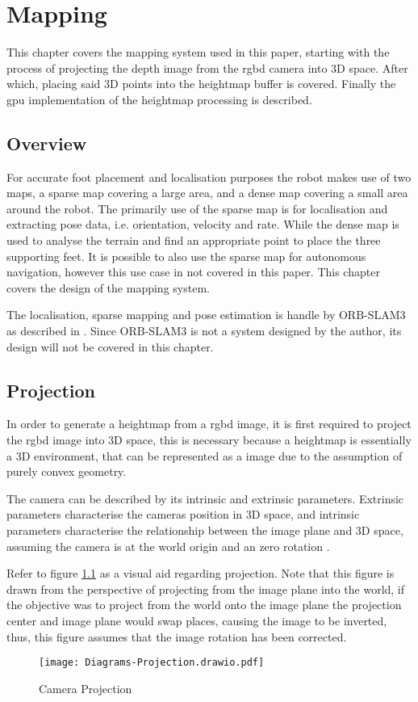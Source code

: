 \chapter{Mapping} \label{chap:mapping}
    This chapter covers the mapping system used in this paper, starting with the process of projecting the depth image from the \ac{rgbd} camera into 3D space.
    After which, placing said 3D points into the heightmap buffer is covered. Finally the \ac{gpu} implementation of the heightmap processing is described.
    \section{Overview}
        For accurate foot placement and localisation purposes the robot makes use of two maps, a sparse map covering a large area, and a dense map covering a small
        area around the robot. The primarily use of the sparse map is for localisation and extracting pose data, i.e. orientation, velocity and rate. While the dense
        map is used to analyse the terrain and find an appropriate point to place the three supporting feet.
        It is possible to also use the sparse map for autonomous navigation, however this use case in not covered in this paper.
        This chapter covers the design of the mapping system.

        The localisation, sparse mapping and pose estimation is handle by ORB-SLAM3 as described in \cite{campos2021orb}. Since ORB-SLAM3 is not a system designed by the author, its
        design will not be covered in this chapter.

    \section{Projection}
        In order to generate a heightmap from a \ac{rgbd} image, it is first required to project the \ac{rgbd} image into 3D space, this is necessary because a heightmap is essentially a 3D environment,
        that can be represented as a image due to the assumption of purely convex geometry. 

        The camera can be described by its intrinsic and extrinsic parameters. Extrinsic parameters characterise the
        cameras position in 3D space, and intrinsic parameters characterise the relationship between the image plane and 3D space, 
        assuming the camera is at the world origin and an zero rotation \citep{hartley2003multiple}.

        Refer to figure \ref{fig:projection} as a visual aid regarding projection. Note that this figure is drawn from the perspective of projecting from the image plane into the world,
        if the objective was to project from the world onto the image plane the projection center and image plane would swap places, causing the image to be inverted, thus, this figure assumes
        that the image rotation has been corrected.
        \begin{figure}[h]
            \centering
            \texttt{[image: Diagrams-Projection.drawio.pdf]}
            \caption{Camera Projection}
            \label{fig:projection}
        \end{figure}

